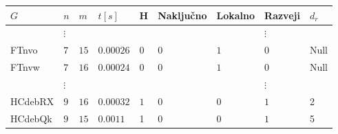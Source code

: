 \documentclass[12pt,a4paper,twoside]{article}
\theoremstyle{definition} %
\theoremstyle{plain} %
\numberwithin{equation}{section}  %
\begin{document}
\begin{table}[]
\begin{tabular}{lllllllll}
\hline
\multicolumn{1}{|l|}{\textbf{$G$}} & \multicolumn{1}{l|}{\textbf{$n$}} & \multicolumn{1}{l|}{\textbf{$m$}} & \multicolumn{1}{l|}{\textbf{$t[s]$}} & \multicolumn{1}{l|}{\textbf{H}} & \multicolumn{1}{l|}{\textbf{Naključno}} & \multicolumn{1}{l|}{\textbf{Lokalno}} & \multicolumn{1}{l|}{\textbf{Razveji}} & \multicolumn{1}{l|}{\textbf{$d_r$}} \\ \hline
  & $\vdots$                          &                                   &                                      &                                 &                                         &                                       & $\vdots$                              &                                     \\ \hline
\multicolumn{1}{|l|}{FTnvo}        & \multicolumn{1}{l|}{$7$}          & \multicolumn{1}{l|}{$15$}         & \multicolumn{1}{l|}{$0.00026$}       & \multicolumn{1}{l|}{0}          & \multicolumn{1}{l|}{$0$}                & \multicolumn{1}{l|}{$1$}              & \multicolumn{1}{l|}{$0$}              & \multicolumn{1}{l|}{Null}           \\ \hline
\multicolumn{1}{|l|}{FTnvw}        & \multicolumn{1}{l|}{$7$}          & \multicolumn{1}{l|}{$16$}         & \multicolumn{1}{l|}{$0.00024$}       & \multicolumn{1}{l|}{0}          & \multicolumn{1}{l|}{$0$}                & \multicolumn{1}{l|}{$1$}              & \multicolumn{1}{l|}{$0$}              & \multicolumn{1}{l|}{Null}           \\ \hline
                                   & $\vdots$                          &                                   &                                      &                                 &                                         &                                       & $\vdots$                              &                                     \\ \hline
\multicolumn{1}{|l|}{HCdebRX}      & \multicolumn{1}{l|}{$9$}          & \multicolumn{1}{l|}{$16$}         & \multicolumn{1}{l|}{$0.00032$}       & \multicolumn{1}{l|}{$1$}        & \multicolumn{1}{l|}{$0$}                & \multicolumn{1}{l|}{$0$}              & \multicolumn{1}{l|}{$1$}              & \multicolumn{1}{l|}{2}              \\ \hline
\multicolumn{1}{|l|}{HCdebQk}      & \multicolumn{1}{l|}{$9$}          & \multicolumn{1}{l|}{$15$}         & \multicolumn{1}{l|}{$0.0011$}        & \multicolumn{1}{l|}{1}          & \multicolumn{1}{l|}{$0$}                & \multicolumn{1}{l|}{$0$}              & \multicolumn{1}{l|}{$1$}              & \multicolumn{1}{l|}{5}              \\ \hline

\end{tabular}
\end{table}
\end{document}
